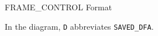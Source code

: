 \begin{manuallistedformatdiagram}{FRAME\_CONTROL Format}
\end{manuallistedformatdiagram}
{\small In the diagram, \texttt{D} abbreviates \texttt{SAVED\_DFA}.\par}
